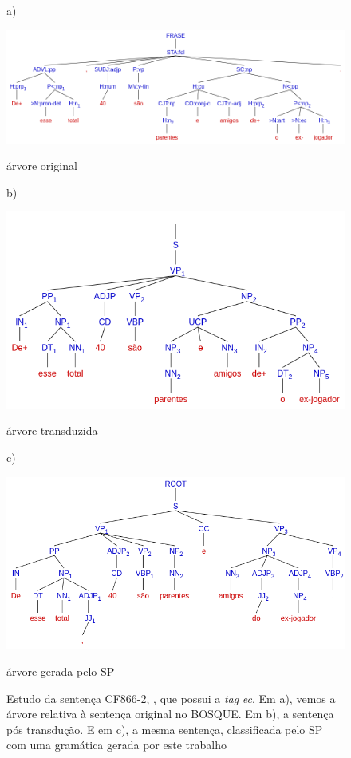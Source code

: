 \begin{figure}[!hb]
    \centering
    a)
    \begin{minipage}{.45\textwidth}
        \includegraphics[width=\linewidth]{imagens/ec_bosque_ec_tree_orig.png}
        \caption{árvore original}
    \end{minipage}
    b)
    \begin{minipage}{.45\textwidth}
        \includegraphics[width=\linewidth]{imagens/ec_bosque_ec_tree_trans.png}
        \caption{árvore transduzida}
    \end{minipage}
    c)
    \begin{minipage}{.45\textwidth}
        \includegraphics[width=\linewidth]{imagens/ec_bosque_ec_tree_ps.png}
        \caption{árvore gerada pelo SP}
    \end{minipage}
    \caption[Estudo de caso BOSQUE - Sentença transduzida com \textit{ec}, e \textit{cu}]{Estudo da sentença CF866-2, , que possui a \textit{tag} \textit{ec}. Em a), vemos a árvore relativa à sentença original no BOSQUE. Em b), a sentença pós transdução. E em c), a mesma sentença, classificada pelo SP com uma gramática gerada por este trabalho}
    \label{fig:ec_bosque_ec_tree}
\end{figure}